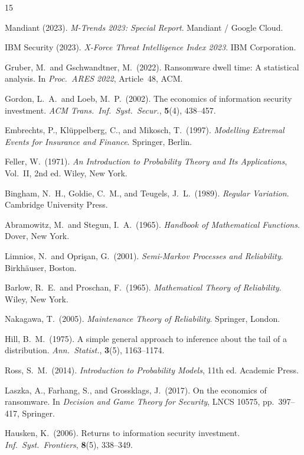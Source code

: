 \documentclass[12pt,a4paper]{article}
\theoremstyle{plain}
\theoremstyle{definition}
\theoremstyle{remark}
\begin{document}
\begin{thebibliography}{15}

Mandiant (2023).
\textit{M-Trends 2023: Special Report}.
Mandiant / Google Cloud.

IBM Security (2023).
\textit{X-Force Threat Intelligence Index 2023}.
IBM Corporation.

Gruber, M.\ and Gschwandtner, M.\ (2022).
Ransomware dwell time: A statistical analysis.
In \textit{Proc.\ ARES 2022}, Article~48, ACM.

Gordon, L.\ A.\ and Loeb, M.\ P.\ (2002).
The economics of information security investment.
\textit{ACM Trans.\ Inf.\ Syst.\ Secur.}, \textbf{5}(4), 438--457.

Embrechts, P., Kl\"{u}ppelberg, C., and Mikosch, T.\ (1997).
\textit{Modelling Extremal Events for Insurance and Finance}.
Springer, Berlin.

Feller, W.\ (1971).
\textit{An Introduction to Probability Theory and Its Applications},
Vol.~II, 2nd ed. Wiley, New York.

Bingham, N.\ H., Goldie, C.\ M., and Teugels, J.\ L.\ (1989).
\textit{Regular Variation}.
Cambridge University Press.

Abramowitz, M.\ and Stegun, I.\ A.\ (1965).
\textit{Handbook of Mathematical Functions}.
Dover, New York.

Limnios, N.\ and Opri\c{s}an, G.\ (2001).
\textit{Semi-Markov Processes and Reliability}.
Birkh\"{a}user, Boston.

Barlow, R.\ E.\ and Proschan, F.\ (1965).
\textit{Mathematical Theory of Reliability}.
Wiley, New York.

Nakagawa, T.\ (2005).
\textit{Maintenance Theory of Reliability}.
Springer, London.

Hill, B.\ M.\ (1975).
A simple general approach to inference about the tail of a distribution.
\textit{Ann.\ Statist.}, \textbf{3}(5), 1163--1174.

Ross, S.\ M.\ (2014).
\textit{Introduction to Probability Models}, 11th ed.
Academic Press.

Laszka, A., Farhang, S., and Grossklags, J.\ (2017).
On the economics of ransomware.
In \textit{Decision and Game Theory for Security},
LNCS 10575, pp.~397--417, Springer.

Hausken, K.\ (2006).
Returns to information security investment.
\textit{Inf.\ Syst.\ Frontiers}, \textbf{8}(5), 338--349.

\end{thebibliography}
\end{document}

